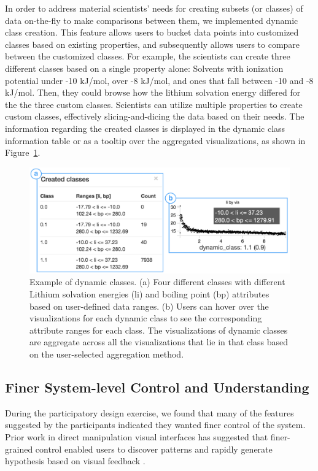  In order to address material scientists' needs for creating subsets (or classes) of data on-the-fly to make comparisons between them, we implemented dynamic class creation. This feature allows users to bucket data points into customized classes based on existing properties, and subsequently allows users to compare between the customized classes. For example, the scientists can create three different classes based on a single property alone: Solvents with ionization potential under -10 kJ/mol, over -8 kJ/mol, and ones that fall between -10 and -8 kJ/mol. Then, they could browse how the lithium solvation energy differed for the the three custom classes.
\npar Scientists can utilize multiple properties to create custom classes, effectively slicing-and-dicing the data based on their needs. The information regarding the created classes is displayed in the dynamic class information table or as a tooltip over the aggregated visualizations, as shown in Figure~\ref{dcc}.
\begin{figure}[h!]
\centering
\includegraphics[width=\linewidth]{figures/dcc_example.pdf}
\vspace{-6pt}
\caption{Example of dynamic classes. (a) Four different classes with different Lithium solvation energies (li) and boiling point (bp) attributes based on user-defined data ranges. (b) Users can hover over the visualizations for each dynamic class to see the corresponding attribute ranges for each class. The visualizations of dynamic classes are aggregate across all the visualizations that lie in that class based on the user-selected aggregation method.}
\label{dcc}
\vspace{-10pt}
\end{figure}
\subsection{Finer System-level Control and  Understanding}
\par During the participatory design exercise, we found that many of the features suggested by the participants indicated they wanted finer control of the system. Prior work in direct manipulation visual interfaces has suggested that finer-grained control enabled users to discover patterns and rapidly generate hypothesis based on visual feedback \cite{Shneiderman1994,Shneiderman2007a}.

